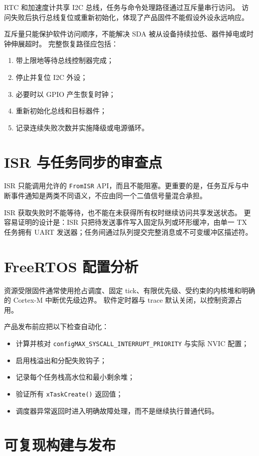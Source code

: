 RTC 和加速度计共享 I2C 总线，任务与命令处理路径通过互斥量串行访问。
访问失败后执行总线复位或重新初始化，体现了产品固件不能假设外设永远响应。

互斥量只能保护软件访问顺序，不能解决 SDA 被从设备持续拉低、器件掉电或时钟伸展超时。
完整恢复路径应包括：
\begin{enumerate}
  \item 带上限地等待总线控制器完成；
  \item 停止并复位 I2C 外设；
  \item 必要时以 GPIO 产生恢复时钟；
  \item 重新初始化总线和目标器件；
  \item 记录连续失败次数并实施降级或电源循环。
\end{enumerate}

\section{ISR 与任务同步的审查点}

ISR 只能调用允许的 \texttt{FromISR} API，而且不能阻塞。更重要的是，任务互斥与中断事件通知是两类不同语义，不应由同一个二值信号量混合承担。

ISR 获取失败时不能等待，也不能在未获得所有权时继续访问共享发送状态。
更容易证明的设计是：ISR 只把待发送事件写入固定队列或环形缓冲，由单一 TX 任务拥有 UART 发送器；任务间通过队列提交完整消息或不可变缓冲区描述符。

\section{FreeRTOS 配置分析}

资源受限固件通常使用抢占调度、固定 tick、有限优先级、受约束的内核堆和明确的 Cortex-M 中断优先级边界。
软件定时器与 trace 默认关闭，以控制资源占用。

产品发布前应把以下检查自动化：
\begin{itemize}
  \item 计算并核对 \texttt{configMAX\_SYSCALL\_INTERRUPT\_PRIORITY} 与实际 NVIC 配置；
  \item 启用栈溢出和分配失败钩子；
  \item 记录每个任务栈高水位和最小剩余堆；
  \item 验证所有 \texttt{xTaskCreate()} 返回值；
  \item 调度器异常返回时进入明确故障处理，而不是继续执行普通代码。
\end{itemize}

\section{可复现构建与发布}


